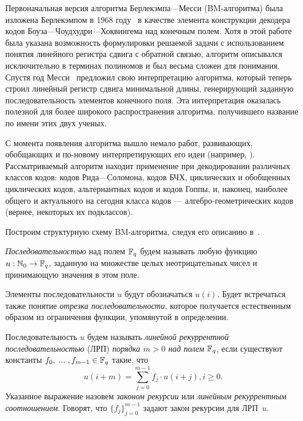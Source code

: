 \documentclass[14pt]{extarticle}
\begin{document}




Первоначальная версия алгоритма Берлекэмпа—Месси (BM-\nspace алгоритма) была
изложена Берлекэмпом в 1968 году~\cite{Berlekamp68} в качестве элемента
конструкции декодера кодов Боуза—Чоудхудри—Хоквингема над конечным полем. Хотя в
этой работе была указана возможность формулировки решаемой задачи с
использованием понятия линейного регистра сдвига с обратной связью, алгоритм
описывался исключительно в терминах полиномов и был весьма сложен для понимания.
Спустя год Месси~\cite{Massey69} предложил свою интерпретацию алгоритма, который
теперь строил линейный регистр сдвига минимальной длины, генерирующий заданную
последовательность элементов конечного поля. Эта интерпретация оказалась
полезной для более широкого распространения алгоритма, получившего название по
имени этих двух ученых.

С момента появления алгоритма вышло немало работ, развивающих, обобщающих и
по-новому интерпретирующих его идеи (например,
\cite{Gashkov04} \cite{Kurakin99} \cite{Sakata89}). Рассматриваемый алгоритм
находит применение при декодировании различных классов кодов: кодов
Рида—Соломона, кодов БЧХ, циклических и обобщенных циклических кодов,
альтернантных кодов и кодов Гоппы, и, наконец, наиболее общего и актуального на
сегодня класса кодов — алгебро-геометрических кодов (вернее, некоторых их
подклассов).

Построим структурную схему BM-алгоритма, следуя его описанию в~\cite{Kurakin94}.

\emph{Последовательностью} над полем $\mathbb F_q$ будем называть любую функцию $u:
\mathbb N_{0} \to \mathbb F_q$, заданную на множестве целых неотрицательных чисел и принимающую значения в этом поле. 

Элементы последовательности $u$ будут обозначаться $u(i)$. Будет встречаться также понятие \emph{отрезка последовательности}, которое получается естественным образом из ограничения функции, упомянутой в определении. 

Последовательность $u$ будем называть \emph{линейной рекуррентной последовательностью }(ЛРП) \emph{порядка $m>0$ над полем }$\mathbb F_q$, если существуют константы $f_{0} ,\; ...\; ,f_{m-1} \in \mathbb F_q$ такие, что
\[u(i+m)=\sum _{j=0}^{m-1}f_{j} \cdot u(i+j) , i\ge 0.\]
Указанное выражение назовем \emph{законом рекурсии} или \emph{линейным рекуррентным соотношением}. Говорят, что $\{f_j\}_{j=0}^{m-1}$ задают закон рекурсии для 
ЛРП~$u$.
\end{document}
